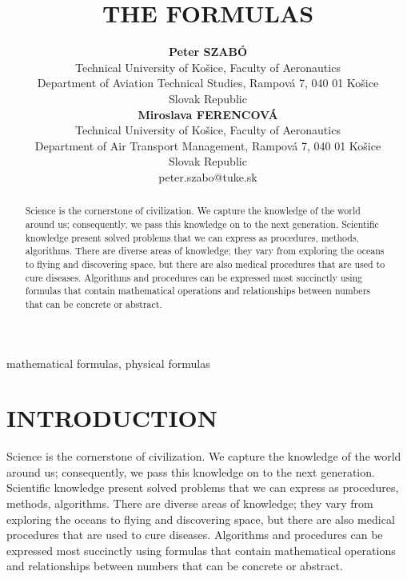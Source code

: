 \documentclass[conference]{IEEEtran}
\begin{document}
\title{THE FORMULAS}

\author{%
\IEEEoverridecommandlockouts%
\begin{minipage}[t]{0.48\textwidth}\centering
{\normalsize\textbf{Peter SZABÓ}}\\[2pt]
{\footnotesize Technical University of Košice, Faculty of Aeronautics%
\\ Department of Aviation Technical Studies, Rampová 7, 040 01 Košice%
\\ Slovak Republic%
}
\end{minipage}%
\hfill%
\begin{minipage}[t]{0.48\textwidth}\centering
{\normalsize\textbf{Miroslava FERENCOVÁ}}\\[2pt]
{\footnotesize Technical University of Košice, Faculty of Aeronautics%
\\ Department of Air Transport Management, Rampová 7, 040 01 Košice%
\\ Slovak Republic%
\\ peter.szabo@tuke.sk%
}
\end{minipage}%
}
\maketitle

\begin{abstract}
Science is the cornerstone of civilization. We capture the knowledge of the world around us;
consequently, we pass this knowledge on to the next generation. Scientific knowledge present solved
problems that we can express as procedures, methods, algorithms. There are diverse areas of
knowledge; they vary from exploring the oceans to flying and discovering space, but there are also
medical procedures that are used to cure diseases. Algorithms and procedures can be expressed most
succinctly using formulas that contain mathematical operations and relationships between numbers
that can be concrete or abstract.
\end{abstract}
\begin{IEEEkeywords}
mathematical formulas, physical formulas
\end{IEEEkeywords}
\section{INTRODUCTION}

Science is the cornerstone of civilization. We capture the knowledge of the world around us;
consequently, we pass this knowledge on to the next generation. Scientific knowledge present solved
problems that we can express as procedures, methods, algorithms. There are diverse areas of
knowledge; they vary from exploring the oceans to flying and discovering space, but there are also
medical procedures that are used to cure diseases. Algorithms and procedures can be expressed most
succinctly using formulas that contain mathematical operations and relationships between numbers
that can be concrete or abstract.
\end{document}
